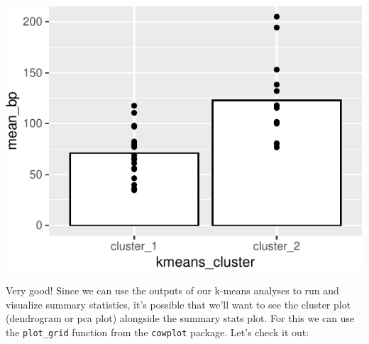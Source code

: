 \documentclass[
]{krantz}
\begin{document}
\begin{center}\includegraphics[width=1\linewidth]{index_files/figure-latex/unnamed-chunk-111-1} \end{center}

Very good! Since we can use the outputs of our k-means analyses to run and visualize summary statistics, it's possible that we'll want to see the cluster plot (dendrogram or pca plot) alongside the summary stats plot. For this we can use the \texttt{plot\_grid} function from the \texttt{cowplot} package. Let's check it out:
\end{document}
